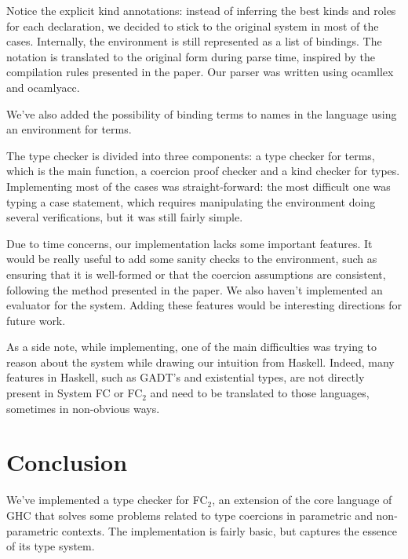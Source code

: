 \documentclass{article}
\newcommand{\fct}{FC\(_2\)\xspace}
\begin{document}
Notice the explicit kind annotations: instead of inferring the best
kinds and roles for each declaration, we decided to stick to the
original system in most of the cases. Internally, the environment is
still represented as a list of bindings. The notation is translated to
the original form during parse time, inspired by the compilation rules
presented in the paper. Our parser was written using ocamllex and
ocamlyacc.

We've also added the possibility of binding terms to names in the
language using an environment for terms.

The type checker is divided into three components: a type checker for
terms, which is the main function, a coercion proof checker and a kind
checker for types. Implementing most of the cases was
straight-forward: the most difficult one was typing a case statement,
which requires manipulating the environment doing several
verifications, but it was still fairly simple.

Due to time concerns, our implementation lacks some important
features. It would be really useful to add some sanity checks to the
environment, such as ensuring that it is well-formed or that the
coercion assumptions are consistent, following the method presented in
the paper. We also haven't implemented an evaluator for the
system. Adding these features would be interesting directions for
future work.

As a side note, while implementing, one of the main difficulties was
trying to reason about the system while drawing our intuition from
Haskell. Indeed, many features in Haskell, such as GADT's and
existential types, are not directly present in System FC or \fct and
need to be translated to those languages, sometimes in non-obvious ways.

\section{Conclusion}

We've implemented a type checker for \fct, an extension of the core
language of GHC that solves some problems related to type coercions in
parametric and non-parametric contexts. The implementation is fairly
basic, but captures the essence of its type system.

{}

\end{document}
